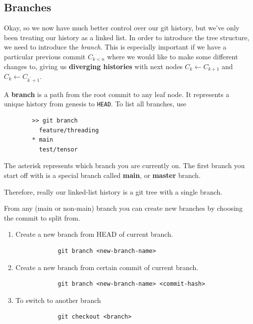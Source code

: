 \subsection{Branches} 

    Okay, so we now have much better control over our git history, but we've only been treating our history as a linked list. In order to introduce the tree structure, we need to introduce the \textit{branch}. This is especially important if we have a particular previous commit $C_{k < n}$ where we would like to make some different changes to, giving us \textbf{diverging histories} with next nodes $C_k \leftarrow C_{k+1}$ and $C_k \leftarrow C_{k^\prime + 1}$. 
    
    \begin{definition}[Branch]
      \label{def:branch}
      A \textbf{branch} is a path from the root commit to any leaf node. It represents a unique history from genesis to \texttt{HEAD}. To list all branches, use 
      \begin{lstlisting}
        >> git branch 
          feature/threading
        * main
          test/tensor
      \end{lstlisting} 
      The asterisk represents which branch you are currently on. The first branch you start off with is a special branch called \textbf{main}, or \textbf{master} branch. 
    \end{definition} 

    Therefore, really our linked-list history is a git tree with a single branch. 

    \begin{definition}
      \label{def:creating-switching-branches}
      From any (main or non-main) branch you can create new branches by choosing the commit to split from. 
      \begin{enumerate}
        \item Create a new branch from HEAD of current branch. 
          \begin{lstlisting}
            git branch <new-branch-name> 
          \end{lstlisting}

        \item Create a new branch from certain commit of current branch. 
          \begin{lstlisting}
            git branch <new-branch-name> <commit-hash>
          \end{lstlisting} 

        \item To switch to another branch 
          \begin{lstlisting}
            git checkout <branch> 
          \end{lstlisting}
      \end{enumerate}
    \end{definition} 

